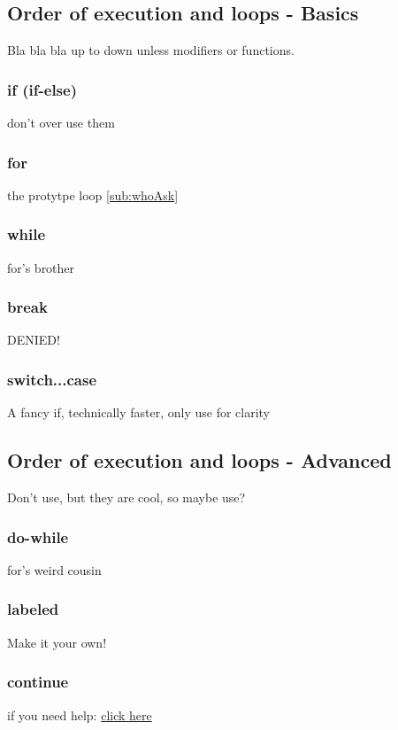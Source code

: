 \subsection{Order of execution and loops - Basics}
\label{sub:execBasic}
Bla bla bla up to down unless modifiers or functions.
    \subsubsection{if (if-else)}
    \label{subsub:if}
don't over use them

    \subsubsection{for}
    \label{subsub:for}
the protytpe loop \ref{sub:whoAsk}

    \subsubsection{while}
    \label{sub:while}
for's brother

    \subsubsection{break}
    \label{subsub:break}
DENIED!

    \subsubsection{switch...case}
    \label{subsub:switch}
A fancy if, technically faster, only use for clarity

\subsection{Order of execution and loops - Advanced}
\label{sub:execAdv}
Don't use, but they are cool, so maybe use?
    \subsubsection{do-while}
    \label{subsub:doWhile}
for's weird cousin

    \subsubsection{labeled}
    \label{subsub:labeled}
Make it your own!

    \subsubsection{continue}
    \label{subsub:continue}
if you need help: \href{http://letmegooglethat.com/?q=continue}{click here}

